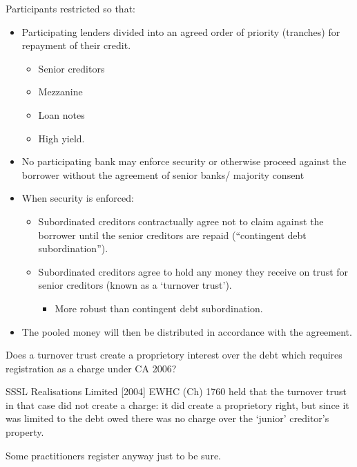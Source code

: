 \documentclass[
]{article}
\providecommand{\tightlist}{%
  \setlength{\itemsep}{0pt}\setlength{\parskip}{0pt}}
\newenvironment{env-a9aa42a3-f5ef-44bc-9cb3-81fc5caedba7}
{
    \savenotes\tcolorbox[blanker,breakable,left=5pt,borderline west={2pt}{-4pt}{gray}]
}
{
    \endtcolorbox\spewnotes
}
\begin{document}
Participants restricted so that:

\begin{itemize}
\tightlist
\item
  Participating lenders divided into an agreed order of priority
  (tranches) for repayment of their credit.

  \begin{itemize}
  \tightlist
  \item
    Senior creditors
  \item
    Mezzanine
  \item
    Loan notes
  \item
    High yield.
  \end{itemize}
\item
  No participating bank may enforce security or otherwise proceed
  against the borrower without the agreement of senior banks/ majority
  consent
\item
  When security is enforced:

  \begin{itemize}
  \tightlist
  \item
    Subordinated creditors contractually agree not to claim against the
    borrower until the senior creditors are repaid (``contingent debt
    subordination'').
  \item
    Subordinated creditors agree to hold any money they receive on trust
    for senior creditors (known as a `turnover trust').

    \begin{itemize}
    \tightlist
    \item
      More robust than contingent debt subordination.
    \end{itemize}
  \end{itemize}
\item
  The pooled money will then be distributed in accordance with the
  agreement.
\end{itemize}

\begin{env-a9aa42a3-f5ef-44bc-9cb3-81fc5caedba7}

Does a turnover trust create a proprietory interest over the debt which
requires registration as a charge under CA 2006?

SSSL Realisations Limited {[}2004{]} EWHC (Ch) 1760 held that the
turnover trust in that case did not create a charge: it did create a
proprietory right, but since it was limited to the debt owed there was
no charge over the `junior' creditor's property.

Some practitioners register anyway just to be sure.

\end{env-a9aa42a3-f5ef-44bc-9cb3-81fc5caedba7}
\end{document}
